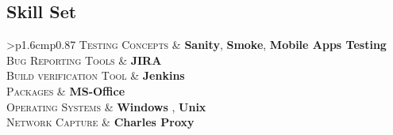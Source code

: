 \documentclass[a4paper]{article} %
\newcommand{\itemlist}[1]{%
    \def\arraystretch{1.2}
    \begin{tabular}{>{\raggedleft}p{1.6cm}p{0.87\linewidth}}
        #1
    \end{tabular}
    \def\arraystretch{1.0}
}
\begin{document}
\begin{multicols}{2}
\section{Skill Set}
    {%
        \itemlist {%
                \textsc{\small Testing Concepts} %
                & \textbf{Sanity}, \textbf{Smoke}, \textbf{Mobile Apps Testing} \\

                \textsc{\small Bug Reporting Tools} %
                & \textbf{JIRA}\\

                \textsc{\small Build verification Tool} %
                & \textbf{Jenkins} \\ 
                
                \textsc{\small Packages} %
                & \textbf{MS-Office}\\

	     \textsc{\small Operating Systems} %
                & \textbf{Windows} , \textbf{Unix}\\

	     \textsc{\small Network Capture} %
                & \textbf{Charles Proxy} \\

                
                \textsc{\small } %
                
            }
    }
 
 



                
                

\end{multicols}
\end{document}
